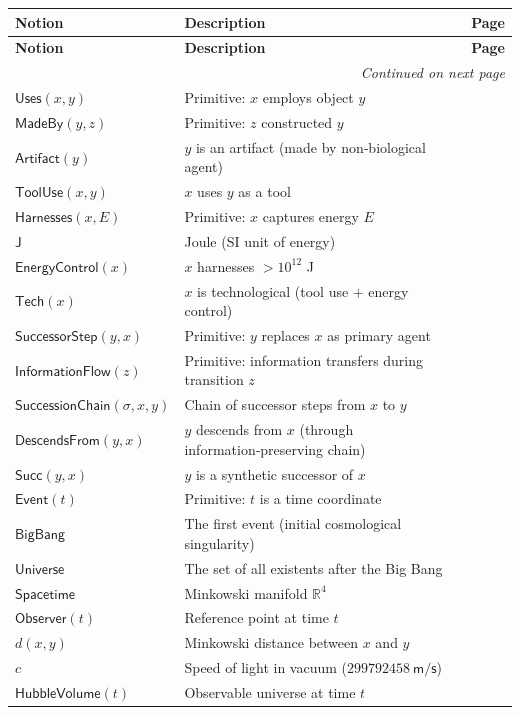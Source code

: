 \documentclass{amsart}
\newenvironment{notiontable}{%
	\renewcommand{\arraystretch}{1.2}%
	\setlength{\tabcolsep}{4pt}%
	\begin{longtable}{|l|l|c|}
		\hline
		\textbf{Notion} & \textbf{Description} & \textbf{Page} \\
		\hline
		\endfirsthead
		\hline
		\textbf{Notion} & \textbf{Description} & \textbf{Page} \\
		\hline
		\endhead
		\hline
		\multicolumn{3}{r}{\textit{Continued on next page}} \\
		\endfoot
		\hline
		\endlastfoot
	}{%
	\end{longtable}%
}
\theoremstyle{break}
\newcommand{\R}{\mathbb{R}}
\newcommand{\Technological}[1]{\mathsf{Tech}(#1)}
\newcommand{\Successor}[2]{\mathsf{Succ}(#1,#2)}
\begin{document}
\begin{notiontable}
	$\mathsf{Uses}(x,y)$ & Primitive: $x$ employs object $y$ & \pageref{def:uses} \\
	$\mathsf{MadeBy}(y,z)$ & Primitive: $z$ constructed $y$ & \pageref{def:madeby} \\
	$\mathsf{Artifact}(y)$ & $y$ is an artifact (made by non‑biological agent) & \pageref{def:artifact} \\
	$\mathsf{ToolUse}(x,y)$ & $x$ uses $y$ as a tool & \pageref{def:tooluse} \\
	$\mathsf{Harnesses}(x,E)$ & Primitive: $x$ captures energy $E$ & \pageref{def:harnesses} \\
	$\mathsf{J}$ & Joule (SI unit of energy) & \pageref{def:joule} \\
	$\mathsf{EnergyControl}(x)$ & $x$ harnesses $>10^{12}$ J & \pageref{def:energycontrol} \\
	$\Technological{x}$ & $x$ is technological (tool use + energy control) & \pageref{def:tech} \\
	
	$\mathsf{SuccessorStep}(y,x)$ & Primitive: $y$ replaces $x$ as primary agent & \pageref{def:successorstep} \\
	$\mathsf{InformationFlow}(z)$ & Primitive: information transfers during transition $z$ & \pageref{def:informationflow} \\
	$\mathsf{SuccessionChain}(\sigma,x,y)$ & Chain of successor steps from $x$ to $y$ & \pageref{def:successionchain} \\
	$\mathsf{DescendsFrom}(y,x)$ & $y$ descends from $x$ (through information‑preserving chain) & \pageref{def:descendsfrom} \\
	$\Successor{y}{x}$ & $y$ is a synthetic successor of $x$ & \pageref{def:successor} \\
	
	$\mathsf{Event}(t)$ & Primitive: $t$ is a time coordinate & \pageref{def:event} \\
	$\mathsf{BigBang}$ & The first event (initial cosmological singularity) & \pageref{def:bigbang} \\
	$\mathsf{Universe}$ & The set of all existents after the Big Bang & \pageref{def:universe} \\
	$\mathsf{Spacetime}$ & Minkowski manifold $\R^4$ & \pageref{def:spacetime} \\
	$\mathsf{Observer}(t)$ & Reference point at time $t$ & \pageref{def:observer} \\
	$d(x,y)$ & Minkowski distance between $x$ and $y$ & \pageref{def:distance} \\
	$c$ & Speed of light in vacuum ($299792458\ \mathsf{m/s}$) & \pageref{def:speedoflight} \\
	$\mathsf{HubbleVolume}(t)$ & Observable universe at time $t$ & \pageref{def:hubblevolume} \\
	

\end{notiontable}
\end{document}
